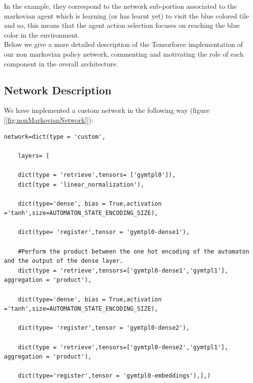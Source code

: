 \documentclass{article}
\begin{document}
In the example, they correspond to the network sub-portion associated to the markovian agent which is learning (or has learnt yet) to visit the blue colored tile and so, this means that 
the agent action selection focuses on reaching the blue color in the environment.\\
Below we give a more detailed description of the Tensorforce implementation of our non markovian policy network, commenting and motivating the role of each component in the overall architecture.







\subsection{Network Description}
\label{network}
We have implemented a custom network in the following way (figure [\ref{fig:nonMarkovianNetwork}]):\\
\begin{lstlisting}
network=dict(type = 'custom', 

    layers= [
    
    dict(type = 'retrieve',tensors= ['gymtpl0']),
    dict(type = 'linear_normalization'),
    
    dict(type='dense', bias = True,activation ='tanh',size=AUTOMATON_STATE_ENCODING_SIZE),
    
    dict(type= 'register',tensor = 'gymtpl0-dense1'),
    
    #Perform the product between the one hot encoding of the automaton and the output of the dense layer.
    dict(type = 'retrieve',tensors=['gymtpl0-dense1','gymtpl1'], aggregation = 'product'),
    
    dict(type='dense', bias = True,activation ='tanh',size=AUTOMATON_STATE_ENCODING_SIZE),
    
    dict(type= 'register',tensor = 'gymtpl0-dense2'), 
    
    dict(type = 'retrieve',tensors=['gymtpl0-dense2','gymtpl1'], aggregation = 'product'),
    
    dict(type='register',tensor = 'gymtpl0-embeddings'),],)
\end{lstlisting}
\end{document}
